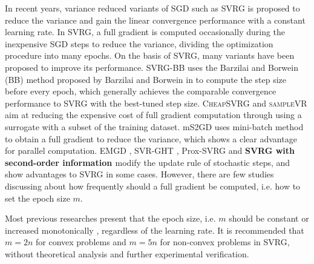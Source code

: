 \documentclass[conference]{IEEEtran}
\begin{document}
In recent years, variance reduced variants of SGD such as SVRG \citep{Johnson:9MAvkbgy}  is proposed to reduce the variance and gain the linear convergence performance with a constant learning rate. In SVRG, a full gradient is computed occasionally during the inexpensive SGD steps to reduce the variance, dividing the optimization procedure into many epochs. On the basis of SVRG, many variants have been proposed to improve its performance.
SVRG-BB \citep{Tan2016Barzilai} uses the Barzilai and Borwein (BB) method proposed by Barzilai and Borwein in \citep{Barzilai1988Two} to compute the step size before every epoch, which generally achieves the comparable convergence performance to SVRG with the best-tuned step size.
\textsc{CheapSVRG} \citep{Shah2016Trading} and \textsc{sampleVR} aim at reducing the expensive cost of full gradient computation through using a surrogate with a subset of the training dataset. 
mS2GD \citep{Liu:2015bx} uses mini-batch method to obtain a full gradient to reduce the variance, which shows a clear advantage for  parallel computation.  EMGD \citep{Zhang2013Linear}, SVR-GHT \citep{Li:2016vh}, Prox-SVRG \citep{Xiao:2014vw} and \textbf{SVRG with second-order information \citep{KolteAccelerating}} modify the update rule of stochastic steps, and show advantages to SVRG in some cases.  However, there are few studies discussing about how frequently should a full gradient be computed, i.e. how to set the epoch size $m$.

Most previous researches present that the epoch size, i.e. $m$ should be constant \citep{Johnson:9MAvkbgy, Tan2016Barzilai, Shah2016Trading} or increased monotonically \citep{Liu:2015bx},  regardless of the learning rate. It is recommended that $m = 2n$ for convex problems and $m = 5n$ for non-convex problems in SVRG, without theoretical analysis and further experimental verification. 
\end{document}
